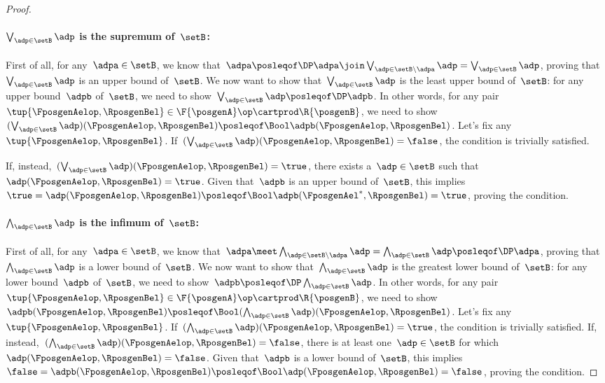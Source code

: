 \begin{proof}
	\paragraph*{$\bigvee_{\adp \in \setB} \adp$ is the supremum of~$\setB$:}
	First of all, for any~$\adpa\in \setB$, we know that~$\adpa\posleqof\DP \adpa \join \bigvee_{\adp \in \setB \backslash \adpa} \adp= \bigvee_{\adp \in \setB} \adp$, proving that~$\bigvee_{\adp \in \setB} \adp$ is an upper bound of~$\setB$.
	We now want to show that~$\bigvee_{\adp \in \setB} \adp$ is the least upper bound of~$\setB$: for any upper bound~$\adpb$ of~$\setB$, we need to show~$\bigvee_{\adp \in \setB} \adp \posleqof\DP\adpb$.
	In other words, for any pair~$\tup{\FposgenAelop,\RposgenBel}\in \F{\posgenA}\op\cartprod \R{\posgenB}$, we need to show~$(\bigvee_{\adp \in \setB} \adp)(\FposgenAelop,\RposgenBel)\posleqof\Bool \adpb(\FposgenAelop,\RposgenBel)$.
	Let's fix any~$\tup{\FposgenAelop,\RposgenBel}$.
	If~$(\bigvee_{\adp \in \setB} \adp)(\FposgenAelop,\RposgenBel)=\false$, the condition is trivially satisfied.

	If, instead,~$(\bigvee_{\adp \in \setB} \adp)(\FposgenAelop,\RposgenBel)=\true$, there exists a~$\adp\in \setB$ such that~$\adp(\FposgenAelop,\RposgenBel)=\true$.
	Given that~$\adpb$ is an upper bound of~$\setB$, this implies~$\true=\adp(\FposgenAelop,\RposgenBel)\posleqof\Bool \adpb(\FposgenAel^*,\RposgenBel)=\true$, proving the condition.

	\paragraph*{$\bigwedge_{\adp \in \setB} \adp$ is the infimum of~$\setB$:}
	First of all, for any~$\adpa\in \setB$, we know that~$\adpa \meet \bigwedge_{\adp \in \setB \backslash \adpa} \adp= \bigwedge_{\adp \in \setB} \adp \posleqof\DP \adpa$, proving that~$\bigwedge_{\adp \in \setB} \adp$ is a lower bound of~$\setB$.
	We now want to show that~$\bigwedge_{\adp \in \setB} \adp$ is the greatest lower bound of~$\setB$: for any lower bound~$\adpb$ of~$\setB$, we need to show~$\adpb\posleqof\DP\bigwedge_{\adp \in \setB} \adp $.
	In other words, for any pair~$\tup{\FposgenAelop,\RposgenBel}\in \F{\posgenA}\op\cartprod \R{\posgenB}$, we need to show~$\adpb(\FposgenAelop,\RposgenBel) \posleqof\Bool (\bigwedge_{\adp \in \setB} \adp)(\FposgenAelop,\RposgenBel)$.
	Let's fix any~$\tup{\FposgenAelop,\RposgenBel}$.
	If~$(\bigwedge_{\adp \in \setB} \adp)(\FposgenAelop,\RposgenBel)=\true$, the condition is trivially satisfied.
	If, instead,~$(\bigwedge_{\adp \in \setB} \adp)(\FposgenAelop,\RposgenBel)=\false$, there is at least one~$\adp\in \setB$ for which~$\adp(\FposgenAelop,\RposgenBel)=\false$.
	Given that~$\adpb$ is a lower bound of~$\setB$, this implies~$\false=\adpb(\FposgenAelop,\RposgenBel)\posleqof\Bool \adp(\FposgenAelop,\RposgenBel)=\false$, proving the condition.
\end{proof}


